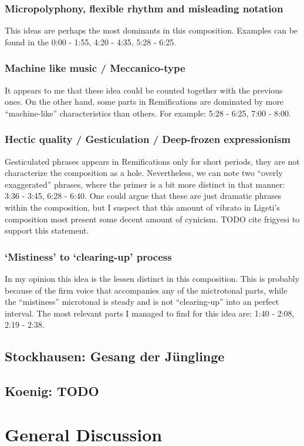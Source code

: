 \documentclass[a4paper,11pt]{article}
\begin{document}
\subsubsection{Micropolyphony, flexible rhythm and misleading notation}

This ideas are perhaps the most dominants in this composition.
Examples can be found in the 0:00 - 1:55, 4:20 - 4:35, 5:28 - 6:25.

\subsubsection{Machine like music / Meccanico-type}

It appears to me that these idea could be counted together with the previous ones.
On the other hand, some parts in Remifications are dominated by more ``machine-like'' characteristics than others.
For example: 5:28 - 6:25, 7:00 - 8:00.

\subsubsection{Hectic quality / Gesticulation / Deep-frozen expressionism}

Gesticulated phrases appears in Remifications only for short periods, they are not characterize the composition as a hole.
Nevertheless, we can note two ``overly exaggerated'' phrases, where the primer is a bit more distinct in that manner: 3:36 - 3:45, 6:28 - 6:40.
One could argue that these are just dramatic phrases within the composition, but I suspect that this amount of vibrato in Ligeti's composition most present some decent amount of cynicism.
TODO cite frigyesi to support this statement.

\subsubsection{‘Mistiness’ to ‘clearing-up’ process}

In my opinion this idea is the lessen distinct in this composition.
This is probably because of the firm voice that accompanies any of the mictrotonal parts, while the ``mistiness'' microtonal is steady and is not ``clearing-up'' into an perfect interval.
The most relevant parts I managed to find for this idea are: 1:40 - 2:08, 2:19 - 2:38.

\subsection{Stockhausen: Gesang der J{\"u}nglinge}
\label{sub:composition_stockhausen}

\subsection{Koenig: TODO}
\label{sub:composition_koenig}

\section{General Discussion}
\label{sec:general_discussion}

\printbibliography[title={Bibliography}]
\end{document}
